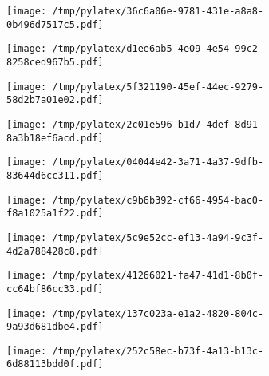 \documentclass{article}
\begin{document}
\begin{figure}[htbp]
\begin{subfigure}[b]{.3\linewidth}
\texttt{[image: /tmp/pylatex/36c6a06e-9781-431e-a8a8-0b496d7517c5.pdf]}
\end{subfigure}
\begin{subfigure}[b]{.3\linewidth}
\texttt{[image: /tmp/pylatex/d1ee6ab5-4e09-4e54-99c2-8258ced967b5.pdf]}
\end{subfigure}
\begin{subfigure}[b]{.3\linewidth}
\texttt{[image: /tmp/pylatex/5f321190-45ef-44ec-9279-58d2b7a01e02.pdf]}
\end{subfigure}
\begin{subfigure}[b]{.3\linewidth}
\texttt{[image: /tmp/pylatex/2c01e596-b1d7-4def-8d91-8a3b18ef6acd.pdf]}
\end{subfigure}
\begin{subfigure}[b]{.3\linewidth}
\texttt{[image: /tmp/pylatex/04044e42-3a71-4a37-9dfb-83644d6cc311.pdf]}
\end{subfigure}
\begin{subfigure}[b]{.3\linewidth}
\texttt{[image: /tmp/pylatex/c9b6b392-cf66-4954-bac0-f8a1025a1f22.pdf]}
\end{subfigure}
\begin{subfigure}[b]{.3\linewidth}
\texttt{[image: /tmp/pylatex/5c9e52cc-ef13-4a94-9c3f-4d2a788428c8.pdf]}
\end{subfigure}
\begin{subfigure}[b]{.3\linewidth}
\texttt{[image: /tmp/pylatex/41266021-fa47-41d1-8b0f-cc64bf86cc33.pdf]}
\end{subfigure}
\begin{subfigure}[b]{.3\linewidth}
\texttt{[image: /tmp/pylatex/137c023a-e1a2-4820-804c-9a93d681dbe4.pdf]}
\end{subfigure}
\begin{subfigure}[b]{.3\linewidth}
\texttt{[image: /tmp/pylatex/252c58ec-b73f-4a13-b13c-6d88113bdd0f.pdf]}
\end{subfigure}
\end{figure}
\end{document}
